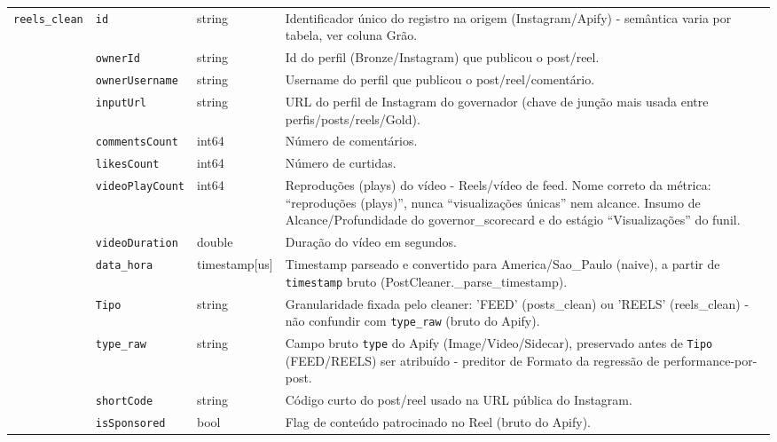 \begin{footnotesize}
\begin{longtable}{p{3.2cm}p{3.0cm}p{2.0cm}p{6.0cm}}
\texttt{reels\_\allowbreak{}clean} & \texttt{id} & string & Identificador único do registro na origem (Instagram/\allowbreak{}Apify) - semântica varia por tabela, ver coluna Grão. \\
\texttt{} & \texttt{ownerId} & string & Id do perfil (Bronze/\allowbreak{}Instagram) que publicou o post/\allowbreak{}reel. \\
\texttt{} & \texttt{ownerUsername} & string & Username do perfil que publicou o post/\allowbreak{}reel/\allowbreak{}comentário. \\
\texttt{} & \texttt{inputUrl} & string & URL do perfil de Instagram do governador (chave de junção mais usada entre perfis/\allowbreak{}posts/\allowbreak{}reels/\allowbreak{}Gold). \\
\texttt{} & \texttt{commentsCount} & int64 & Número de comentários. \\
\texttt{} & \texttt{likesCount} & int64 & Número de curtidas. \\
\texttt{} & \texttt{videoPlayCount} & int64 & Reproduções (plays) do vídeo - Reels/\allowbreak{}vídeo de feed. Nome correto da métrica: ``reproduções (plays)'', nunca ``visualizações únicas'' nem alcance. Insumo de Alcance/\allowbreak{}Profundidade do governor\_\allowbreak{}scorecard e do estágio ``Visualizações'' do funil. \\
\texttt{} & \texttt{videoDuration} & double & Duração do vídeo em segundos. \\
\texttt{} & \texttt{data\_\allowbreak{}hora} & timestamp[us] & Timestamp parseado e convertido para America/\allowbreak{}Sao\_\allowbreak{}Paulo (naive), a partir de \texttt{timestamp} bruto (PostCleaner.\_\allowbreak{}parse\_\allowbreak{}timestamp). \\
\texttt{} & \texttt{Tipo} & string & Granularidade fixada pelo cleaner: 'FEED' (posts\_\allowbreak{}clean) ou 'REELS' (reels\_\allowbreak{}clean) - não confundir com \texttt{type\_\allowbreak{}raw} (bruto do Apify). \\
\texttt{} & \texttt{type\_\allowbreak{}raw} & string & Campo bruto \texttt{type} do Apify (Image/\allowbreak{}Video/\allowbreak{}Sidecar), preservado antes de \texttt{Tipo} (FEED/\allowbreak{}REELS) ser atribuído - preditor de Formato da regressão de performance-por-post. \\
\texttt{} & \texttt{shortCode} & string & Código curto do post/\allowbreak{}reel usado na URL pública do Instagram. \\
\texttt{} & \texttt{isSponsored} & bool & Flag de conteúdo patrocinado no Reel (bruto do Apify). \\

\end{longtable}
\end{footnotesize}
